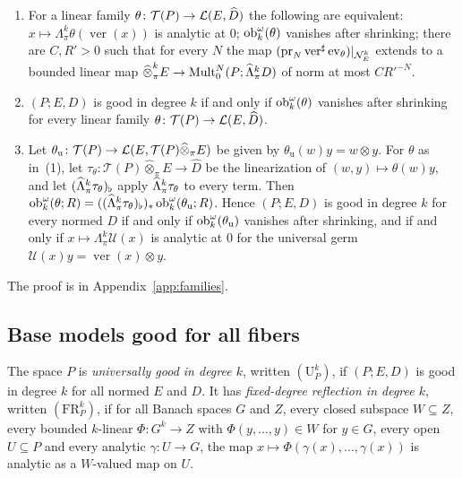 \begin{theorem}\label{fam2:thm:class}
\begin{enumerate}
\item For a linear family $\theta\colon\mathcal T(P)\to\mathcal L(E,\widehat D)$ the following are equivalent:
$x\mapsto\Lambda^k_\pi\theta(\operatorname{ver}(x))$ is analytic at $0$; $\operatorname{ob}^\omega_k(\theta)$ vanishes after shrinking;
there are $C,R'>0$ such that for every $N$ the map $(\operatorname{pr}_N\operatorname{ver}^\sharp\operatorname{ev}_\theta)|_{\mathcal N^k_E}$
extends to a bounded linear map $\widehat\otimes^k_\pi E\to\operatorname{Mult}^N_0(P;\widehat\Lambda^k_\pi D)$ of norm at most $CR'^{-N}$.
\item $(P;E,D)$ is good in degree $k$ if and only if $\operatorname{ob}^\omega_k(\theta)$ vanishes after shrinking for every linear family
$\theta\colon\mathcal T(P)\to\mathcal L(E,\widehat D)$.
\item Let $\theta_{\mathrm u}\colon\mathcal T(P)\to\mathcal L(E,\mathcal T(P)\widehat\otimes_\pi E)$ be given by
$\theta_{\mathrm u}(w)y=w\otimes y$. For $\theta$ as in~(1), let $\tau_\theta\colon\mathcal T(P)\widehat\otimes_\pi E\to\widehat D$
be the linearization of $(w,y)\mapsto\theta(w)y$, and let $(\widehat\Lambda^k_\pi\tau_\theta)_\flat$ apply $\widehat\Lambda^k_\pi\tau_\theta$
to every term. Then $\operatorname{ob}^\omega_k(\theta;R)=((\widehat\Lambda^k_\pi\tau_\theta)_\flat)_*\operatorname{ob}^\omega_k(\theta_{\mathrm u};R)$. Hence
$(P;E,D)$ is good in degree $k$ for every normed $D$ if and only if $\operatorname{ob}^\omega_k(\theta_{\mathrm u})$ vanishes after
shrinking, and if and only if $x\mapsto\Lambda^k_\pi\mathcal U(x)$ is analytic at $0$ for the universal germ
$\mathcal U(x)y=\operatorname{ver}(x)\otimes y$.
\end{enumerate}
\end{theorem}

The proof is in Appendix~\ref{app:families}.

\subsection{Base models good for all fibers}\label{fam2:ssec:bases}

\begin{definition}\label{fam2:def:reflection}
The space $P$ is \emph{universally good in degree $k$}, written $(\mathrm U^k_P)$, if $(P;E,D)$ is good in degree $k$ for
all normed $E$ and $D$. It has \emph{fixed-degree reflection in degree $k$}, written $(\mathrm{FR}^k_P)$, if for all Banach
spaces $G$ and $Z$, every closed subspace $W\subseteq Z$, every bounded $k$-linear $\Phi\colon G^k\to Z$ with
$\Phi(y,\dots,y)\in W$ for $y\in G$, every open $U\subseteq P$ and every analytic $\gamma\colon U\to G$, the map
$x\mapsto\Phi(\gamma(x),\dots,\gamma(x))$ is analytic as a $W$-valued map on $U$.
\end{definition}

